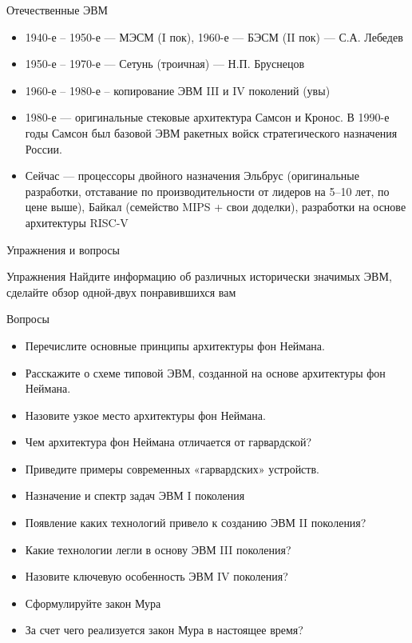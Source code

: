 \documentclass[xetex,aspectratio=43]{beamer}
\begin{document}
\begin{frame}{Отечественные ЭВМ}
	\begin{itemize}
		\item
		1940-е -- 1950-е --- МЭСМ (I пок), 1960-е --- БЭСМ (II пок) --- С.А.
		Лебедев
		\item
		1950-е -- 1970-е --- Сетунь (троичная) --- Н.П. Бруснецов
		\item
		1960-е -- 1980-е -- копирование ЭВМ III и IV поколений (увы)
		\item
		1980-е --- оригинальные стековые архитектура Самсон и Кронос. В 1990-е
		годы Самсон был базовой ЭВМ ракетных войск стратегического назначения
		России.
		\item
		Сейчас --- процессоры двойного назначения Эльбрус (оригинальные
		разработки, отставание по производительности от лидеров на 5--10 лет,
		по цене выше), Байкал (семейство MIPS + свои доделки), разработки на
		основе архитектуры RISC-V
	\end{itemize}
\end{frame}

\begin{frame}{Упражнения и вопросы}
	\begin{block}{Упражнения}
		Найдите информацию об различных исторически значимых ЭВМ, сделайте обзор
		одной-двух понравившихся вам
	\end{block}
	
	\begin{block}{Вопросы}
		\begin{itemize}
			\tightlist
			\item
			Перечислите основные принципы архитектуры фон Неймана.
			\item
			Расскажите о схеме типовой ЭВМ, созданной на основе архитектуры фон
			Неймана.
			\item
			Назовите узкое место архитектуры фон Неймана.
			\item
			Чем архитектура фон Неймана отличается от гарвардской?
			\item
			Приведите примеры современных «гарвардских» устройств.
			\item
			Назначение и спектр задач ЭВМ I поколения
			\item
			Появление каких технологий привело к созданию ЭВМ II поколения?
			\item
			Какие технологии легли в основу ЭВМ III поколения?
			\item
			Назовите ключевую особенность ЭВМ IV поколения?
			\item
			Сформулируйте закон Мура
			\item
			За счет чего реализуется закон Мура в настоящее время?
		\end{itemize}
	\end{block}
\end{frame}

\postamble
\end{document}
